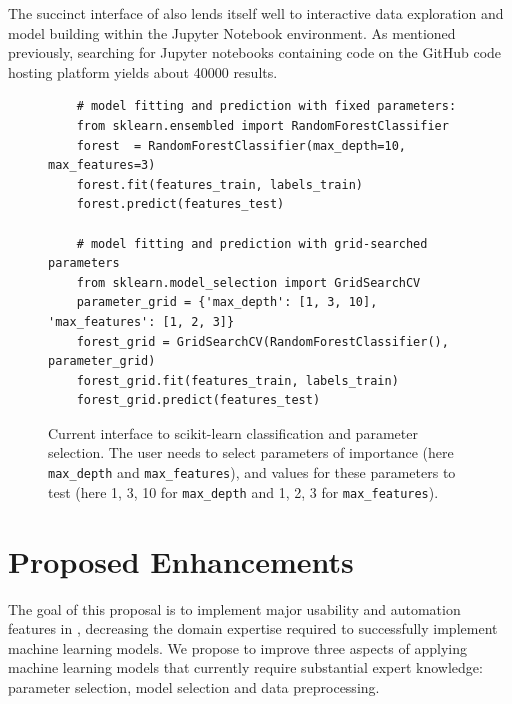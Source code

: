 The succinct interface of \sklearn{} also lends itself well to interactive
data exploration and model building within the Jupyter Notebook environment.
As mentioned previously, searching for Jupyter notebooks containing
\sklearn{} code on the GitHub code hosting platform yields about 40000
results.

\begin{figure}
    \begin{verbatim}
    # model fitting and prediction with fixed parameters:
    from sklearn.ensembled import RandomForestClassifier
    forest  = RandomForestClassifier(max_depth=10, max_features=3)
    forest.fit(features_train, labels_train)
    forest.predict(features_test)

    # model fitting and prediction with grid-searched parameters
    from sklearn.model_selection import GridSearchCV
    parameter_grid = {'max_depth': [1, 3, 10], 'max_features': [1, 2, 3]}
    forest_grid = GridSearchCV(RandomForestClassifier(), parameter_grid)
    forest_grid.fit(features_train, labels_train)
    forest_grid.predict(features_test)
    \end{verbatim}
    \vspace{-5mm}
    \label{gridsearch}
    \caption{Current interface to scikit-learn classification and parameter
        selection. The user needs to select parameters of importance (here
        \texttt{max\_depth} and \texttt{max\_features}), and values for these
        parameters to test (here 1, 3, 10 for \texttt{max\_depth} and 1, 2, 3
        for \texttt{max\_features}).}
\end{figure}

\section{Proposed Enhancements}
The goal of this proposal
is to implement major usability and automation features in \sklearn{}, decreasing
the domain expertise required to successfully implement machine learning models.
We propose to improve three aspects of applying machine learning models that
currently require substantial expert knowledge: parameter selection, model
selection and data preprocessing.

